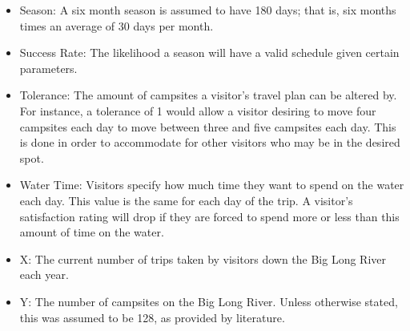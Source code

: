 \documentclass[11pt]{article} %
\begin{document}
\begin{itemize}
\item Season: A six month season is assumed to have 180 days; that is,
six months times an average of 30 days per month.

\item Success Rate: The likelihood a season will have a valid schedule
given certain parameters.

\item Tolerance: The amount of campsites a visitor's travel plan can be
altered by. For instance, a tolerance of 1 would allow a visitor desiring
to move four campsites each day to move between three and five campsites
each day. This is done in order to accommodate for other visitors who may
be in the desired spot.

\item Water Time: Visitors specify how much time they want to spend on the
water each day. This value is the same for each day of the trip. A visitor's
satisfaction rating will drop if they are forced to spend
more or less than this amount of time on the water.

\item X: The current number of trips taken by visitors down the Big Long River
each year.

\item Y: The number of campsites on the Big Long River. Unless otherwise stated,
this was assumed to be 128, as provided by literature\cite{NumCampsites}.
\end{itemize}
\end{document}
